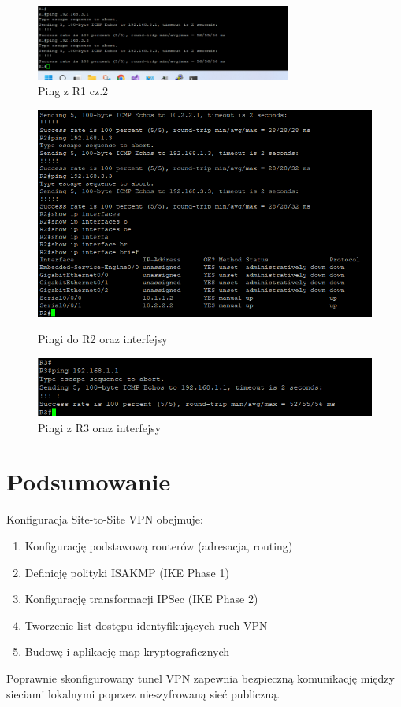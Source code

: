 \documentclass[12pt,twoside,a4paper,openany]{article}
\begin{document}
\begin{figure}[ht!]
    \centering
    \includegraphics[width=0.75\textwidth]{routery/R1/ping2.png}
    \caption{Ping z R1 cz.2}
    \label{fig:adresacja_ip}
\end{figure}

\begin{figure}[ht!]
    \centering
    \begin{minipage}[t]{0.48\textwidth}
        \centering
        \includegraphics[width=\textwidth]{routery/R2/R2.png}
        \caption{Pingi do R2 oraz interfejsy}
        \label{fig:r2_ping}
    \end{minipage}
    \hfill
    \begin{minipage}[t]{0.48\textwidth}
        \centering
        \includegraphics[width=\textwidth]{routery/R3/Zrzut ekranu 2025-06-02 194011.png}
        \caption{Pingi z R3 oraz interfejsy}
        \label{fig:r3_ping}
    \end{minipage}
\end{figure}
\clearpage
\section{Podsumowanie}
Konfiguracja Site-to-Site VPN obejmuje:
\begin{enumerate}
\item Konfigurację podstawową routerów (adresacja, routing)
\item Definicję polityki ISAKMP (IKE Phase 1)
\item Konfigurację transformacji IPSec (IKE Phase 2)
\item Tworzenie list dostępu identyfikujących ruch VPN
\item Budowę i aplikację map kryptograficznych
\end{enumerate}
Poprawnie skonfigurowany tunel VPN zapewnia bezpieczną komunikację między sieciami lokalnymi poprzez nieszyfrowaną sieć publiczną.
\end{document}
